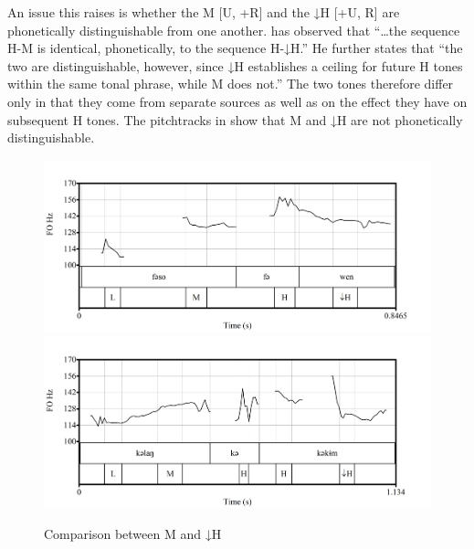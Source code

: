 \documentclass[output=paper,modfonts,nonflat,
colorlinks, citecolor=brown,
]{langsci/langscibook}
\begin{document}
An issue this raises is whether the M  [\textminus U, +R] and the ↓H  [+U, \textminus R] are phonetically distinguishable from one another. \citet[162]{Hyman1979babanki} has observed that “…the sequence H-M is identical, phonetically, to the sequence H-↓H.” He further states that “the two are distinguishable, however, since ↓H establishes a ceiling for future H tones within the same tonal phrase, while M does not.” The two tones therefore differ only in that they come from separate sources as well as on the effect they have on subsequent H tones. The pitchtracks in  show that M and ↓H are not phonetically distinguishable. 


\begin{figure}[p]
	{\includegraphics[width=.95\textwidth]{figures/fig-akumbu-2a}}\\
	{\includegraphics[width=.95\textwidth]{figures/fig-akumbu-2b}}
\caption{Comparison between M and ↓H}\label{fig:akumbu:2}
\end{figure}
 
\end{document}
